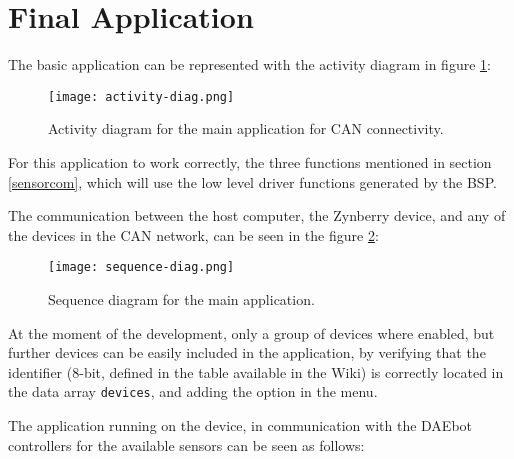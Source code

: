 

\section{Final Application}

The basic application can be represented with the activity diagram in figure \ref{fig:activity}:

\begin{figure}[h!]
	\centering
	\texttt{[image: activity-diag.png]}
	\caption{Activity diagram for the main application for CAN connectivity.}
	\label{fig:activity}
\end{figure}

For this application to work correctly, the three functions mentioned in section \ref{sensorcom}, which will use the low level driver functions generated by the BSP.

The communication between the host computer, the Zynberry device, and any of the devices in the CAN network, can be seen in the figure \ref{fig:sequence}:

\begin{figure}[h!]
	\centering
	\texttt{[image: sequence-diag.png]}
	\caption{Sequence diagram for the main application.}
	\label{fig:sequence}
\end{figure}

At the moment of the development, only a group of devices where enabled, but further devices can be easily included in the application, by verifying that the identifier (8-bit, defined in the table available in the Wiki) is correctly located in the data array \texttt{devices}, and adding the option in the menu.



The application running on the device, in communication with the DAEbot controllers for the available sensors can be seen as follows:

